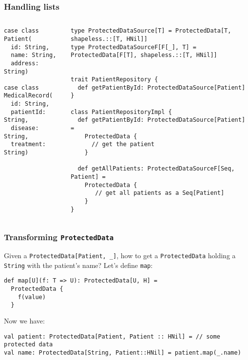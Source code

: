 \documentclass[aspectratio=169]{beamer}
\begin{document}
\begin{frame}[fragile]
\frametitle{Handling lists}
\begin{columns}
\begin{column}{0.2\textwidth}

\begin{lstlisting}[style=myScalastyle,frame=none]
case class Patient(
  id: String,
  name: String,
  address: String)
  
case class MedicalRecord(
  id: String,
  patientId: String,
  disease: String,
  treatment: String)
\end{lstlisting}


\end{column}
\pause

\begin{column}{0.8\textwidth}  

\begin{lstlisting}[style=myScalastyle,frame=none]
type ProtectedDataSource[T] = ProtectedData[T, shapeless.::[T, HNil]] 
type ProtectedDataSourceF[F[_], T] = ProtectedData[F[T], shapeless.::[T, HNil]]
 

trait PatientRepository {
  def getPatientById: ProtectedDataSource[Patient]
}

class PatientRepositoryImpl {
  def getPatientById: ProtectedDataSource[Patient] =
    ProtectedData {
      // get the patient
    }
    
  def getAllPatients: ProtectedDataSourceF[Seq, Patient] =
    ProtectedData {
       // get all patients as a Seq[Patient]
    }
}

\end{lstlisting}


\end{column}
\end{columns}

\end{frame}

\begin{frame}[fragile]
\frametitle{Transforming \texttt{ProtectedData}}

Given a \texttt{ProtectedData[Patient, \_]}, how to get a \texttt{ProtectedData} holding a \texttt{String} with the patient's name?
\pause
Let's define \texttt{map}:
\begin{lstlisting}[style=myScalastyle,frame=none]
def map[U](f: T => U): ProtectedData[U, H] =
  ProtectedData {
    f(value)
  }
\end{lstlisting}
\pause
Now we have:
\begin{lstlisting}[style=myScalastyle,frame=none]
val patient: ProtectedData[Patient, Patient :: HNil] = // some protected data
val name: ProtectedData[String, Patient::HNil] = patient.map(_.name)
\end{lstlisting}

\end{frame}
\end{document}
